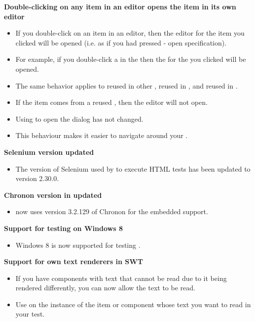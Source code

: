\textbf{Double-clicking on any item in an editor opens the item in its own editor}
\begin{itemize}
\item If you double-click on an item in an editor, then the editor for the item you clicked will be opened (i.e. as if you had pressed  - open specification). 
\item For example, if you double-click a \gdcase{} in the \gdtestsuitebrowser{} then the \gdtestcaseeditor{} for the \gdcase{} you clicked will be opened.
\item The same behavior applies to \gdcases{} reused in other \gdcases{}, \gdsuites{} reused in \gdjobs{}, and \gdehandlers{} reused in \gdcases{}. 
\item If the item comes from a reused \gdproject{}, then the editor will not open.
\item Using  to open the  dialog has not changed.
\item This behaviour makes it easier to navigate around your \gdproject{}. 
\end{itemize}

\textbf{Selenium version updated}
\begin{itemize}
\item The version of Selenium used by \app{} to execute HTML tests has been updated to version 2.30.0.
\end{itemize}

\textbf{Chronon version in \app{} updated }
\begin{itemize}
\item \app{} now uses version 3.2.129 of Chronon for the embedded support.
\end{itemize}

\textbf{Support for testing on Windows 8}
\begin{itemize}
\item Windows 8 is now supported for testing \gdauts{}.
\end{itemize}

\textbf{Support for own text renderers in SWT}
\begin{itemize}
\item If you have components with text that cannot be read due to it being rendered differently, you can now allow the text to be read.
\item Use  on the instance of the item or component whose text you want to read in your test. 
\end{itemize}
